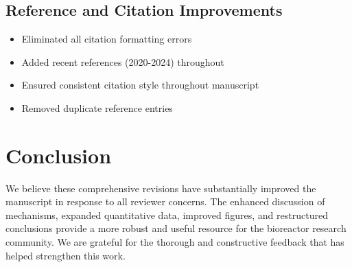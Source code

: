 \documentclass[12pt,a4paper]{article}
\begin{document}
\subsection{Reference and Citation Improvements}
\begin{itemize}
\item Eliminated all citation formatting errors
\item Added recent references (2020-2024) throughout
\item Ensured consistent citation style throughout manuscript
\item Removed duplicate reference entries
\end{itemize}

\section*{Conclusion}

We believe these comprehensive revisions have substantially improved the manuscript in response to all reviewer concerns. The enhanced discussion of mechanisms, expanded quantitative data, improved figures, and restructured conclusions provide a more robust and useful resource for the bioreactor research community. We are grateful for the thorough and constructive feedback that has helped strengthen this work.
\end{document}
